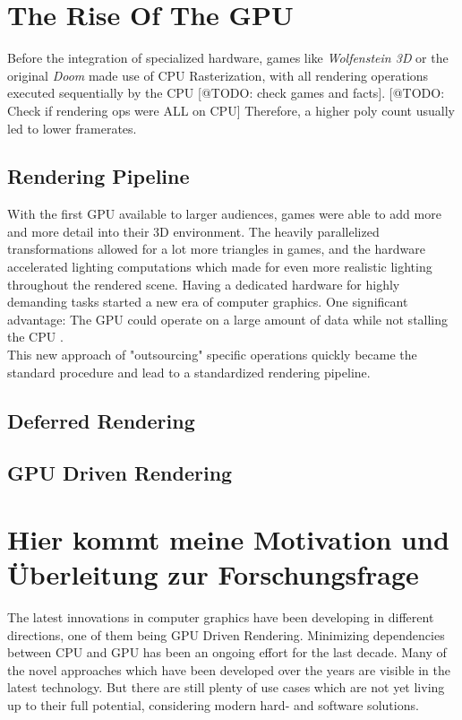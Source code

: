 \section{The Rise Of The GPU}

Before the integration of specialized hardware, games like \emph{Wolfenstein 3D} or the 
original \emph{Doom} made use of \ac{CPU} Rasterization, with all rendering operations 
executed sequentially by the \ac{CPU} [@TODO: check games and facts].
[@TODO: Check if rendering ops were ALL on CPU] Therefore, a higher poly count usually 
led to lower framerates.

\subsection{Rendering Pipeline}

With the first \ac{GPU} available to larger audiences, games were able to add more and more 
detail into their 3D environment. The heavily parallelized transformations allowed for a lot 
more triangles in games, and the hardware accelerated lighting computations which made for 
even more realistic lighting throughout the rendered scene. Having a dedicated hardware for 
highly demanding tasks started a new era of computer graphics. One significant advantage: 
The \ac{GPU} could operate on a large amount of data while not stalling the \ac{CPU} \cite{Fenno2024}.\\

\noindent 
This new approach of "outsourcing" specific operations quickly became the standard procedure and 
lead to a standardized rendering pipeline. 



\subsection{Deferred Rendering}



\subsection{GPU Driven Rendering}


\section{Hier kommt meine Motivation und Überleitung zur Forschungsfrage}

The latest innovations in computer graphics have been developing in different directions,
one of them being \ac{GPU} Driven Rendering. Minimizing dependencies between \ac{CPU} and \ac{GPU} 
has been an ongoing effort for the last decade. Many of the novel approaches which have been developed 
over the years are visible in the latest technology. But there are still plenty of use cases 
which are not yet living up to their full potential, considering modern hard- and software solutions.\\

